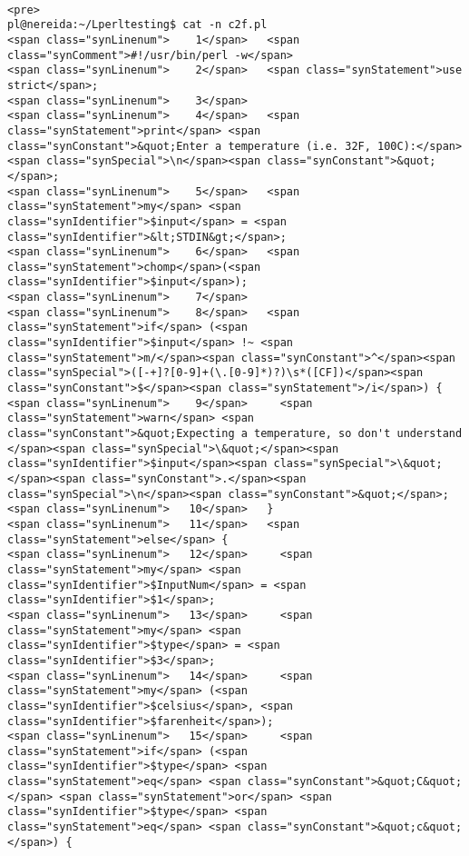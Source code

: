\begin{verbatim}

<pre>
pl@nereida:~/Lperltesting$ cat -n c2f.pl
<span class="synLinenum">    1</span>   <span class="synComment">#!/usr/bin/perl -w</span>
<span class="synLinenum">    2</span>   <span class="synStatement">use strict</span>;
<span class="synLinenum">    3</span> 
<span class="synLinenum">    4</span>   <span class="synStatement">print</span> <span class="synConstant">&quot;Enter a temperature (i.e. 32F, 100C):</span><span class="synSpecial">\n</span><span class="synConstant">&quot;</span>;
<span class="synLinenum">    5</span>   <span class="synStatement">my</span> <span class="synIdentifier">$input</span> = <span class="synIdentifier">&lt;STDIN&gt;</span>;
<span class="synLinenum">    6</span>   <span class="synStatement">chomp</span>(<span class="synIdentifier">$input</span>);
<span class="synLinenum">    7</span> 
<span class="synLinenum">    8</span>   <span class="synStatement">if</span> (<span class="synIdentifier">$input</span> !~ <span class="synStatement">m/</span><span class="synConstant">^</span><span class="synSpecial">([-+]?[0-9]+(\.[0-9]*)?)\s*([CF])</span><span class="synConstant">$</span><span class="synStatement">/i</span>) {
<span class="synLinenum">    9</span>     <span class="synStatement">warn</span> <span class="synConstant">&quot;Expecting a temperature, so don't understand </span><span class="synSpecial">\&quot;</span><span class="synIdentifier">$input</span><span class="synSpecial">\&quot;</span><span class="synConstant">.</span><span class="synSpecial">\n</span><span class="synConstant">&quot;</span>;
<span class="synLinenum">   10</span>   }
<span class="synLinenum">   11</span>   <span class="synStatement">else</span> {
<span class="synLinenum">   12</span>     <span class="synStatement">my</span> <span class="synIdentifier">$InputNum</span> = <span class="synIdentifier">$1</span>;
<span class="synLinenum">   13</span>     <span class="synStatement">my</span> <span class="synIdentifier">$type</span> = <span class="synIdentifier">$3</span>;
<span class="synLinenum">   14</span>     <span class="synStatement">my</span> (<span class="synIdentifier">$celsius</span>, <span class="synIdentifier">$farenheit</span>);
<span class="synLinenum">   15</span>     <span class="synStatement">if</span> (<span class="synIdentifier">$type</span> <span class="synStatement">eq</span> <span class="synConstant">&quot;C&quot;</span> <span class="synStatement">or</span> <span class="synIdentifier">$type</span> <span class="synStatement">eq</span> <span class="synConstant">&quot;c&quot;</span>) {

\end{verbatim}
